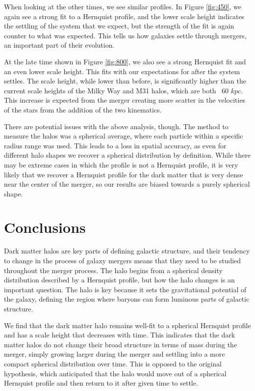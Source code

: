 \documentclass[linenumbers]{aastex631}
\begin{document}
When looking at the other times, we see similar profiles. In Figure \ref{fig:450}, we again see a strong fit to a Hernquist profile, and the lower scale height indicates the settling of the system that we expect, but the strength of the fit is again counter to what was expected. This tells us how galaxies settle through mergers, an important part of their evolution.

At the late time shown in Figure \ref{fig:800}, we also see a strong Hernquist fit and an even lower scale height. This fits with our expectations for after the system settles. The scale height, while lower than before, is significantly higher than the current scale heights of the Milky Way and M31 halos, which are both ~60 $kpc$. This increase is expected from the merger creating more scatter in the velocities of the stars from the addition of the two kinematics.

There are potential issues with the above analysis, though. The method to measure the halos was a spherical average, where each particle within a specific radius range was used. This leads to a loss in spatial accuracy, as even for different halo shapes we recover a spherical distribution by definition. While there may be extreme cases in which the profile is not a Hernquist profile, it is very likely that we recover a Hernquist profile for the dark matter that is very dense near the center of the merger, so our results are biased towards a purely spherical shape.

\section{Conclusions}
Dark matter halos are key parts of defining galactic structure, and their tendency to change in the process of galaxy mergers means that they need to be studied throughout the merger process. The halo begins from a spherical density distribution described by a Hernquist profile, but how the halo changes is an important question. The halo is key because it sets the gravitational potential of the galaxy, defining the region where baryons can form luminous parts of galactic structure.

We find that the dark matter halo remains well-fit to a spherical Hernquist profile and has a scale height that decreases with time. This indicates that the dark matter halos do not change their broad structure in terms of mass during the merger, simply growing larger during the merger and settling into a more compact spherical distribution over time. This is opposed to the original hypothesis, which anticipated that the halo would move out of a spherical Hernquist profile and then return to it after given time to settle.
\end{document}
